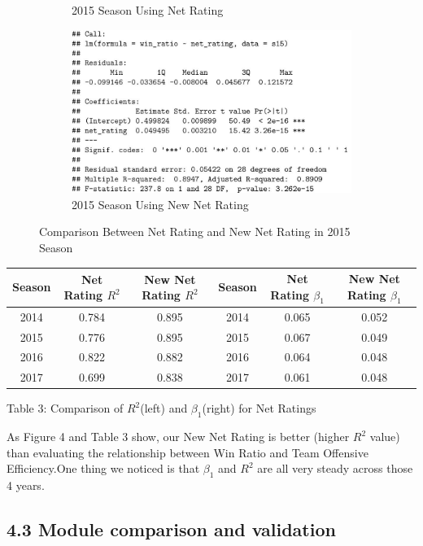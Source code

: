 \documentclass[11pt]{article}
\begin{document}
\begin{figure}[h!]
\begin{subfigure}[b]{0.42\linewidth}
    \caption{2015 Season Using Net Rating}
  \end{subfigure}
  \begin{subfigure}[b]{0.42\linewidth}
    \includegraphics[width=\linewidth]{new_nr_summary.jpg}
    \caption{2015 Season Using New Net Rating}
  \end{subfigure}
  \caption{Comparison Between Net Rating and New Net Rating in 2015 Season}
\end{figure}

\begin{center}
\begin{tabular}{|c|c|c|c|c|c|}
\hline
Season& Net Rating $R^2$ & New Net Rating $R^2$ & Season& Net Rating $\beta_1$ & New Net Rating $\beta_1$\\
\hline
 2014& 0.784 & 0.895 &2014 & 0.065 & 0.052 \\
 2015& 0.776 & 0.895 &2015 & 0.067 & 0.049 \\ 
 2016& 0.822 & 0.882 &2016 & 0.064 & 0.048 \\
 2017& 0.699 & 0.838 &2017 & 0.061 & 0.048 \\
\hline
\end{tabular}
\bigskip

Table 3: Comparison of $R^2$(left) and $\beta_1$(right) for Net Ratings
\end{center}

As Figure 4 and Table 3 show, our New Net Rating is better (higher $R^2$ value) than evaluating the relationship between Win Ratio and Team Offensive Efficiency.One thing we noticed is that $\beta_1$ and $R^2$ are all very steady across those 4 years.

\newpage
\subsection*{4.3 Module comparison and validation}
\end{document}
